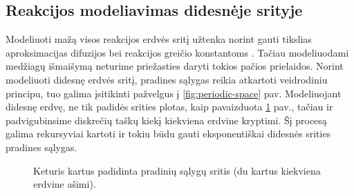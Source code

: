 \newpage

\subsection{Reakcijos modeliavimas didesnėje srityje}

Modeliuoti mažą visos reakcijos erdvės sritį užtenka norint gauti tikslias aproksimacijas difuzijos bei reakcijos greičio konstantoms \cite{mackeviciusCloserLookComputer2012}. Tačiau modeliuodami medžiagų išmaišymą neturime priežasties daryti tokios pačios prielaidos. Norint modeliuoti didesnę erdvės sritį, pradines sąlygas reikia atkartoti veidrodiniu principu, tuo galima įsitikinti pažvelgus į \ref{fig:periodic-space} pav. Modeliuojant didesnę erdvę, ne tik padidės srities plotas, kaip pavaizduota \ref{large-initial-conditions} pav., tačiau ir padvigubinsime diskrečių taškų kiekį kiekviena erdvine kryptimi. Šį procesą galima rekursyviai kartoti ir tokiu būdu gauti eksponentiškai didesnės srities pradines sąlygas.


\begin{figure}[h!]
\centering
{}
\caption{Keturis kartus padidinta pradinių sąlygų sritis (du kartus kiekviena erdvine ašimi). }

\label{large-initial-conditions}
\end{figure}

